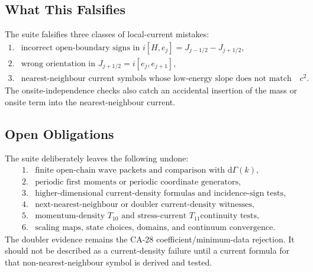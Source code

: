 \subsection{What This Falsifies}

The suite falsifies three classes of local-current mistakes:
\[
\begin{array}{ll}
1.&\text{incorrect open-boundary signs in }
   i[H,e_j]=J_{j-1/2}-J_{j+1/2},\\
2.&\text{wrong orientation in }
   J_{j+1/2}=i[e_j,e_{j+1}],\\
3.&\text{nearest-neighbour current symbols whose low-energy slope does not
   match the selected }c^2.
\end{array}
\]
The onsite-independence checks also catch an accidental insertion of the mass or
onsite term into the nearest-neighbour current.

\subsection{Open Obligations}

The suite deliberately leaves the following undone:
\[
\begin{array}{ll}
1.&\text{finite open-chain wave packets and comparison with }
   \mathrm d\Gamma(k),\\
2.&\text{periodic first moments or periodic coordinate generators},\\
3.&\text{higher-dimensional current-density formulas and incidence-sign tests},\\
4.&\text{next-nearest-neighbour or doubler current-density witnesses},\\
5.&\text{momentum-density }T_{10}\text{ and stress-current }T_{11}\text{
   continuity tests},\\
6.&\text{scaling maps, state choices, domains, and continuum convergence.}
\end{array}
\]
The doubler evidence remains the CA-28 coefficient/minimum-data rejection.  It
should not be described as a current-density failure until a current formula for
that non-nearest-neighbour symbol is derived and tested.
